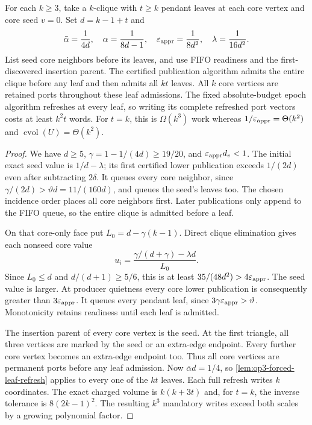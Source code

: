 \begin{proposition}
\label{prop:op3-clique-leaf-refresh}
For each $k\geq3$, take a $k$-clique with $t\geq k$ pendant leaves at
each core vertex and core seed $v=0$. Set $d=k-1+t$ and
\[
 \bar\alpha=\frac1{4d},\quad \alpha=\frac1{8d-1},\quad
 \varepsilon_{\mathrm{appr}}=\frac1{8d^2},\quad \lambda=\frac1{16d^2}.
\]
List seed core neighbors before its leaves, and use FIFO readiness and the
first-discovered insertion parent. The certified publication algorithm
admits the entire clique before any leaf and then admits all $kt$ leaves.
All $k$ core vertices are retained ports throughout these leaf admissions.
The fixed absolute-budget epoch algorithm refreshes at every leaf, so
writing its complete refreshed port vectors costs at least $k^2t$ words.
For $t=k$, this is $\Omega(k^3)$ work whereas
$1/\varepsilon_{\mathrm{appr}}=\Theta(k^2)$ and $\operatorname{cvol}(U)=\Theta(k^2)$.
\end{proposition}
\begin{proof}
We have $d\geq5$, $\gamma=1-1/(4d)\geq19/20$, and
$\varepsilon_{\mathrm{appr}} d_v<1$. The initial exact seed value is $1/d-\lambda$;
its first certified lower publication exceeds $1/(2d)$ even after
subtracting $2\delta$. It queues every core neighbor, since
$\gamma/(2d)>\vartheta d=11/(160d)$, and queues the seed's leaves too.
The chosen incidence order places all core neighbors first. Later
publications only append to the FIFO queue, so the entire clique is
admitted before a leaf.

On that core-only face put $L_0=d-\gamma(k-1)$. Direct clique elimination
gives each nonseed core value
\[
 u_i=\frac{\gamma/(d+\gamma)-\lambda d}{L_0}.
\]
Since $L_0\leq d$ and $d/(d+1)\geq5/6$, this is at least
$35/(48d^2)>4\varepsilon_{\mathrm{appr}}$. The seed value is larger. At producer quietness
every core lower publication is consequently greater than $3\varepsilon_{\mathrm{appr}}$.
It queues every pendant leaf, since $3\gamma\varepsilon_{\mathrm{appr}}>\vartheta$.
Monotonicity retains readiness until each leaf is admitted.

The insertion parent of every core vertex is the seed. At the first
triangle, all three vertices are marked by the seed or an extra-edge
endpoint. Every further core vertex becomes an extra-edge endpoint too.
Thus all core vertices are permanent ports before any leaf admission.
Now $\bar\alpha d=1/4$, so \cref{lem:op3-forced-leaf-refresh} applies to
every one of the $kt$ leaves. Each full refresh writes $k$ coordinates.
The exact charged volume is $k(k+3t)$ and, for $t=k$, the inverse tolerance
is $8(2k-1)^2$. The resulting $k^3$ mandatory writes exceed both scales
by a growing polynomial factor.
\end{proof}

